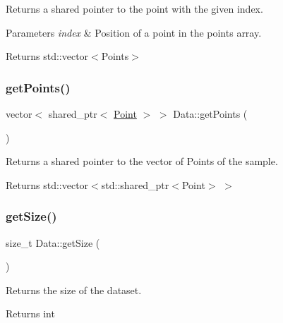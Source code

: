 Returns a shared pointer to the point with the given index. 


\begin{DoxyParams}{Parameters}
{\em index} & Position of a point in the points array. \\
\hline
\end{DoxyParams}
\begin{DoxyReturn}{Returns}
std\+::vector$<$\+Points$>$ 
\end{DoxyReturn}
\mbox{\label{class_data_a9310e45321bca4335b8ab3031d343e16}} 
\subsubsection{\texorpdfstring{get\+Points()}{getPoints()}}
{\footnotesize\ttfamily vector$<$ shared\+\_\+ptr$<$ \hyperlink{class_point}{Point} $>$ $>$ Data\+::get\+Points (\begin{DoxyParamCaption}{ }\end{DoxyParamCaption})}



Returns a shared pointer to the vector of Points of the sample. 

\begin{DoxyReturn}{Returns}
std\+::vector$<$std\+::shared\+\_\+ptr$<$\+Point$>$ $>$ 
\end{DoxyReturn}
\mbox{\label{class_data_a269f9d89ef47b9cf30454cd88c8ccf65}} 
\subsubsection{\texorpdfstring{get\+Size()}{getSize()}}
{\footnotesize\ttfamily size\+\_\+t Data\+::get\+Size (\begin{DoxyParamCaption}{ }\end{DoxyParamCaption})\hspace{0.3cm}{\ttfamily [inline]}}



Returns the size of the dataset. 

\begin{DoxyReturn}{Returns}
int 
\end{DoxyReturn}
\mbox{\label{class_data_a26376768a100f1999ef3ac15a2aa2a67}} 
